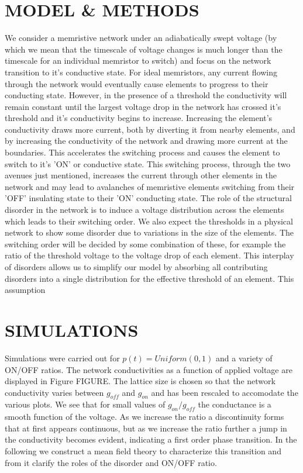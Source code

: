 \documentclass[aps,prl,preprint,groupedaddress]{revtex4-1}
\begin{document}
\section{MODEL \& METHODS}


We consider a memristive network under an adiabatically swept voltage (by
which we
mean that the timescale of voltage changes is much longer than the timescale
for an individual memristor to switch) and focus on the network transition
to it's conductive state.  For ideal memristors, any current
flowing through the network would eventually cause elements to progress to
their conducting state.  However, in the presence of a threshold the
conductivity will remain constant until the largest voltage drop in the
network has crossed it's threshold and it's conductivity begins to increase.
Increasing the
element's conductivity draws more current, both by diverting it from nearby
elements, and by increasing the conductivity of the network and drawing more
current at the boundaries.  This accelerates the switching process and causes
the element to switch to it's 'ON' or conductive state.  This switching
process,
through the two avenues just mentioned, increases the current through other
elements in the network and may lead to avalanches of memristive elements
switching from their 'OFF' insulating state to their 'ON' conducting state. 
The role of the structural disorder in the network is to induce a voltage
distribution across the elements which leads to their switching order. We also
expect the thresholds in a physical network to show some disorder due to
variations in the size of the elements. The switching order will be decided by some
combination of these, for example the ratio of the threshold voltage to the
voltage drop of each element.  This interplay of disorders allows us to
simplify our model by absorbing all contributing disorders into a single
distribution for the effective threshold of an element.  This assumption 


\section{SIMULATIONS}

Simulations were carried out for $p(t) = Uniform(0, 1)$ and a variety of
ON/OFF ratios. The network conductivities as a function of applied voltage
are displayed in Figure FIGURE. The lattice size is chosen so that the
network conductivity varies between $g_{off}$ and $g_{on}$ and has been
rescaled to accomodate the various plots.  We see that for small values
of $g_{on}/g_{off}$ the conductance is a smooth function of the voltage.
As we increase the ratio a discontinuity forms that at first appears
continuous, but as we increase the ratio further a jump in the
conductivity becomes evident, indicating a first order
phase transition. In the following we construct a mean field theory to
characterize this transition and from it clarify the roles of the disorder and
ON/OFF ratio.
\end{document}
